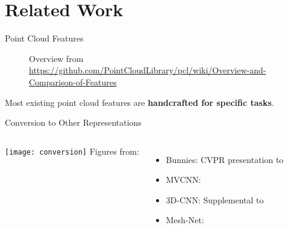 \section{Related Work}
\begin{frame}[c]{Point Cloud Features}
    \large
    \begin{figure}
        \captionsetup[figure]{labelformat=empty}
        \small
        
        \caption{Overview from \url{https://github.com/PointCloudLibrary/pcl/wiki/Overview-and-Comparison-of-Features}}
    \end{figure}
    Most existing point cloud features are \textbf{handcrafted for specific tasks}. \\
\end{frame}


\begin{frame}[c]{Conversion to Other Representations}
    \begin{columns}
        \texttt{[image: conversion]}
        \color{ocre}
        Figures from:
        \begin{itemize}
                \color{ocre}
            \item Bunnies: CVPR presentation to \cite{qi2017pointnet} \\
            \item MVCNN: \cite{li2019angular} \\
            \item 3D-CNN: Supplemental to \cite{qi2017pointnet} \\
            \item Mesh-Net: \cite{feng2019meshnet} \\
        \end{itemize}
    \end{columns}
\end{frame}



